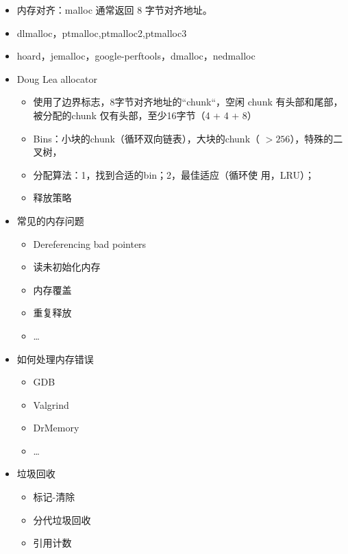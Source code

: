 \documentclass[a4paper, 11pt]{article}
\begin{document}
\begin{itemize}
\begin{itemize}
\begin{itemize}
{						数。}
					  \item{分配策略：1，决定合适的空闲块链表，若找到，则分配，2
						，若没有找到，则使用sbrk向内核申请分配内存。}
					  \item{小结：高吞吐率，内存利用率}
					  \end{itemize}
				\end{itemize}
			  \item{内存对齐：malloc 通常返回 8 字节对齐地址。}
			  \item{dlmalloc，ptmalloc,ptmalloc2,ptmalloc3}
			  \item{hoard，jemalloc，google-perftools，dmalloc，nedmalloc}
			  \item{Doug Lea allocator}
				\begin{itemize}
				  \item{使用了边界标志，8字节对齐地址的``chunk“，空闲 chunk 有头部和尾部，
					被分配的chunk 仅有头部，至少16字节（4 + 4 + 8）}
				  \item{Bins：小块的chunk（循环双向链表），大块的chunk（
					$> 256$），特殊的二叉树，}
				  \item{分配算法：1，找到合适的bin；2，最佳适应（循环使
					用，LRU）；}
				  \item{释放策略}
				  \end{itemize}
				\item{常见的内存问题}
				  \begin{itemize}
					\item{Dereferencing bad pointers}
					\item{读未初始化内存}
					\item{内存覆盖}
					\item{重复释放}
					\item{\dots}
					\end{itemize}
				  \item{如何处理内存错误}
					\begin{itemize}
					  \item{GDB}
					  \item{Valgrind}
					  \item{DrMemory}
					  \item{\dots}
					  \end{itemize}
					\item{垃圾回收}
					  \begin{itemize}
						\item{标记-清除}
						\item{分代垃圾回收}
						\item{引用计数}
					    \end{itemize}
  \end{itemize}
\end{document}
